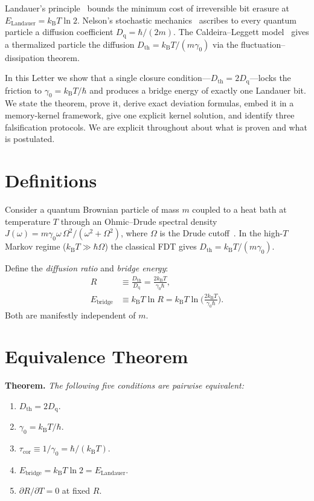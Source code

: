 \documentclass[twocolumn,showpacs,preprintnumbers,amsmath,amssymb]{revtex4-2}
\newcommand{\kB}{k_{\mathrm{B}}}
\newcommand{\Dth}{D_{\mathrm{th}}}
\newcommand{\Dq}{D_{\mathrm{q}}}
\newcommand{\tcor}{\tau_{\mathrm{cor}}}
\newcommand{\Ebr}{E_{\mathrm{bridge}}}
\newcommand{\EL}{E_{\mathrm{Landauer}}}
\begin{document}
Landauer's principle~\cite{Landauer1961} bounds the minimum cost
of irreversible bit erasure at $\EL = \kB T \ln 2$.
Nelson's stochastic mechanics~\cite{Nelson1966} ascribes to every
quantum particle a diffusion coefficient $\Dq = \hbar/(2m)$.
The Caldeira--Leggett model~\cite{CaldeiraLeggett1983} gives a
thermalized particle the diffusion $\Dth = \kB T/(m\gamma_0)$
via the fluctuation--dissipation theorem.

In this Letter we show that a single closure
condition---$\Dth = 2\Dq$---locks the friction to
$\gamma_0 = \kB T/\hbar$ and produces a bridge energy of
exactly one Landauer bit.  We state the theorem, prove it,
derive exact deviation formulas, embed it in a memory-kernel
framework, give one explicit kernel solution, and identify
three falsification protocols.  We are explicit throughout
about what is proven and what is postulated.

\section{Definitions}

Consider a quantum Brownian particle of mass $m$ coupled to
a heat bath at temperature $T$ through an Ohmic--Drude spectral
density
$J(\omega) = m\gamma_0\omega\,\Omega^2/(\omega^2 + \Omega^2)$,
where $\Omega$ is the Drude cutoff~\cite{CaldeiraLeggett1983}.
In the high-$T$ Markov regime ($\kB T \gg \hbar\Omega$) the
classical FDT gives $\Dth = \kB T/(m\gamma_0)$.

Define the \emph{diffusion ratio} and \emph{bridge energy}:
\begin{align}
  R &\equiv \frac{\Dth}{\Dq}
    = \frac{2\kB T}{\gamma_0 \hbar} ,
  \label{eq:R}\\
  \Ebr &\equiv \kB T \ln R
    = \kB T \ln\!\biggl(\frac{2\kB T}{\gamma_0\hbar}\biggr) .
  \label{eq:Ebr}
\end{align}
Both are manifestly independent of $m$.

\section{Equivalence Theorem}

\noindent\textbf{Theorem.}
\textit{The following five conditions are pairwise equivalent:}
\begin{enumerate}
  \item[(i)]   $\Dth = 2\Dq$.
  \item[(ii)]  $\gamma_0 = \kB T / \hbar$.
  \item[(iii)] $\tcor \equiv 1/\gamma_0 = \hbar / (\kB T)$.
  \item[(iv)]  $\Ebr = \kB T \ln 2 = \EL$.
  \item[(v)]   $\partial R/\partial T = 0$ at fixed $R$.
\end{enumerate}
\end{document}
